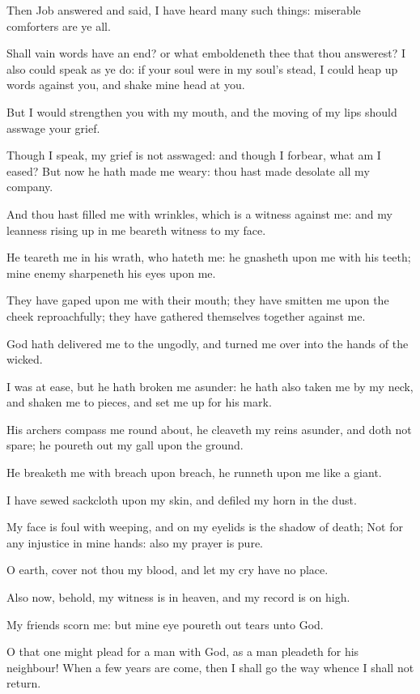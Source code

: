 \Chapter
\Verse Then Job answered and said, \Verse I have heard many such things: miserable comforters are ye all.

\Verse Shall vain words have an end? or what emboldeneth thee that thou answerest?  \Verse I also could speak as ye do: if your soul were in my soul's stead, I could heap up words against you, and shake mine head at you.

\Verse But I would strengthen you with my mouth, and the moving of my lips should asswage your grief.

\Verse Though I speak, my grief is not asswaged: and though I forbear, what am I eased?  \Verse But now he hath made me weary: thou hast made desolate all my company.

\Verse And thou hast filled me with wrinkles, which is a witness against me: and my leanness rising up in me beareth witness to my face.

\Verse He teareth me in his wrath, who hateth me: he gnasheth upon me with his teeth; mine enemy sharpeneth his eyes upon me.

\Verse They have gaped upon me with their mouth; they have smitten me upon the cheek reproachfully; they have gathered themselves together against me.

\Verse God hath delivered me to the ungodly, and turned me over into the hands of the wicked.

\Verse I was at ease, but he hath broken me asunder: he hath also taken me by my neck, and shaken me to pieces, and set me up for his mark.

\Verse His archers compass me round about, he cleaveth my reins asunder, and doth not spare; he poureth out my gall upon the ground.

\Verse He breaketh me with breach upon breach, he runneth upon me like a giant.

\Verse I have sewed sackcloth upon my skin, and defiled my horn in the dust.

\Verse My face is foul with weeping, and on my eyelids is the shadow of death; \Verse Not for any injustice in mine hands: also my prayer is pure.

\Verse O earth, cover not thou my blood, and let my cry have no place.

\Verse Also now, behold, my witness is in heaven, and my record is on high.

\Verse My friends scorn me: but mine eye poureth out tears unto God.

\Verse O that one might plead for a man with God, as a man pleadeth for his neighbour!  \Verse When a few years are come, then I shall go the way whence I shall not return.



